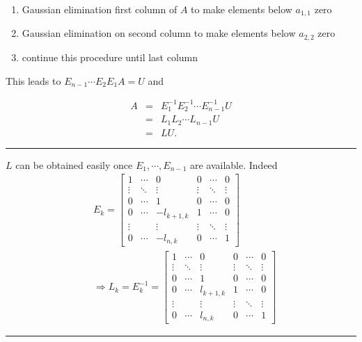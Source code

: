 \documentclass[11pt]{article}
\providecommand{\tightlist}{%
      \setlength{\itemsep}{0pt}\setlength{\parskip}{0pt}}
\begin{document}
\begin{enumerate}
\def\labelenumi{\arabic{enumi}.}
\tightlist
\item
  Gaussian elimination first column of \(A\) to make elements below
  \(a_{1,1}\) zero
\item
  Gaussian elimination on second column to make elements below
  \(a_{2,2}\) zero
\item
  continue this procedure until last column
\end{enumerate}

This leads to \(E_{n-1}\cdots E_2E_1 A=U\) and

\[\begin{aligned}
A & = & E_1^{-1}E_2^{-1}\cdots E_{n-1}^{-1}U\\
  & = &L_1L_2\cdots L_{n-1}U\\
  & = &LU.\end{aligned}\]

\begin{center}\rule{0.5\linewidth}{\linethickness}\end{center}

\(L\) can be obtained easily once \(E_1, \cdots, E_{n-1}\) are
available. Indeed \[\begin{aligned}
& E_k = \left[\begin{array}{cccccc}
1&\cdots&0&0&\cdots&0\\
\vdots&\ddots&\vdots&\vdots&\ddots&\vdots\\
0&\cdots&1&0&\cdots&0\\
0&\cdots&-l_{k+1, k}&1&\cdots&0\\
\vdots&&\vdots&\vdots&\ddots&\vdots\\
0&\cdots&-l_{n,k}&0&\cdots&1
\end{array}\right]\\
& \Longrightarrow L_k = E_k^{-1} =\left[\begin{array}{cccccc}
1&\cdots&0&0&\cdots&0\\
\vdots&\ddots&\vdots&\vdots&\ddots&\vdots\\
0&\cdots&1&0&\cdots&0\\
0&\cdots&l_{k+1,k}&1&\cdots&0\\
\vdots&&\vdots&\vdots&\ddots&\vdots\\
0&\cdots&l_{n,k}&0&\cdots&1
\end{array}\right]\end{aligned}\]

\begin{center}\rule{0.5\linewidth}{\linethickness}\end{center}
\end{document}

